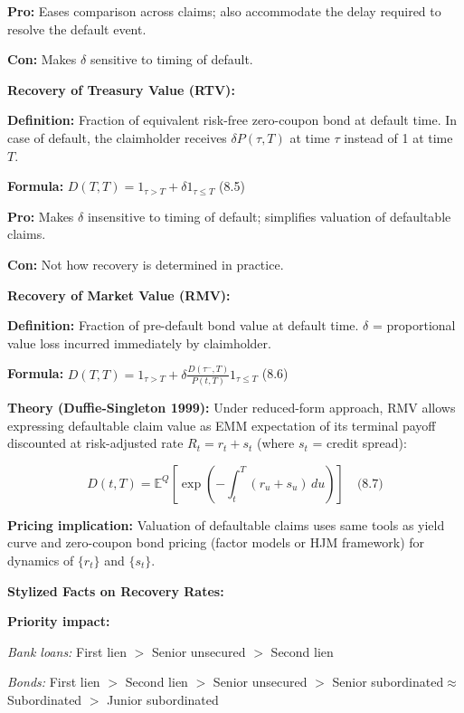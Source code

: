 \documentclass[12pt,a4paper]{article}
\begin{document}
\textbf{Pro:} Eases comparison across claims; also accommodate the delay required to resolve the default event.

\textbf{Con:} Makes $\delta$ sensitive to timing of default.

\vspace{0.3em}
\noindent\textbf{Recovery of Treasury Value (RTV):}

\textbf{Definition:} Fraction of equivalent risk-free zero-coupon bond at default time.  In case of default, the claimholder receives $\delta P(\tau, T)$ at time $\tau$ instead of 1 at time $T$.

\textbf{Formula:} $D(T,T) = 1_{\tau>T} + \delta 1_{\tau \leq T}$ \quad (8.5)

\textbf{Pro:} Makes $\delta$ insensitive to timing of default; simplifies valuation of defaultable claims.

\textbf{Con:} Not how recovery is determined in practice.

\vspace{0.3em}
\noindent\textbf{Recovery of Market Value (RMV):}

\textbf{Definition:} Fraction of pre-default bond value at default time. $\delta$ = proportional value loss incurred immediately by claimholder.

\textbf{Formula:} $D(T,T) = 1_{\tau>T} + \delta \frac{D(\tau^-, T)}{P(t,T)} 1_{\tau \leq T}$ \quad (8.6)

\textbf{Theory (Duffie-Singleton 1999):} Under reduced-form approach, RMV allows expressing defaultable claim value as EMM expectation of its terminal payoff discounted at risk-adjusted rate $R_t = r_t + s_t$ (where $s_t$ = credit spread):

$$D(t,T) = \mathbb{E}^Q\left[\exp\left(-\int_t^T (r_u + s_u)\,du\right)\right] \quad \text{(8.7)}$$

\textbf{Pricing implication:} Valuation of defaultable claims uses same tools as yield curve and zero-coupon bond pricing (factor models or HJM framework) for dynamics of $\{r_t\}$ and $\{s_t\}$.

\vspace{0.3em}
\noindent\textbf{Stylized Facts on Recovery Rates:}

\textbf{Priority impact:}

\noindent\textit{Bank loans:} First lien $>$ Senior unsecured $>$ Second lien

\noindent\textit{Bonds:} First lien $>$ Second lien $>$ Senior unsecured $>$  Senior subordinated$\approx$ Subordinated  $>$ Junior subordinated
\end{document}
